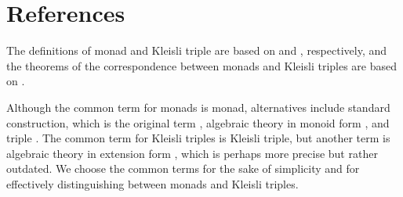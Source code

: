 \section{References}
\label{sec:monads-references}

The definitions of monad and Kleisli triple are based on
\parencite[137]{maclane-1998} and \parencite[58]{moggi-1991},
respectively, and the theorems of the correspondence between monads
and Kleisli triples are based on \parencites[24,
  26--29]{manes-1976}[61]{moggi-1991}.

\begin{terminology}
  \label{ter:monads}

  Although the common term for monads is monad, alternatives include
  standard construction, which is the original term
  \parencite[30]{manes-1976}, algebraic theory in monoid form
  \parencite[29]{manes-1976}, and triple
  \parencites[83]{barr-wells-2005}[372]{barr-wells-2012}. The common
  term for Kleisli triples is Kleisli triple, but another term is
  algebraic theory in extension form \parencite[32]{manes-1976}, which
  is perhaps more precise but rather outdated. We choose the common
  terms for the sake of simplicity and for effectively distinguishing
  between monads and Kleisli triples.

\end{terminology}

\clearemptydoublepage
